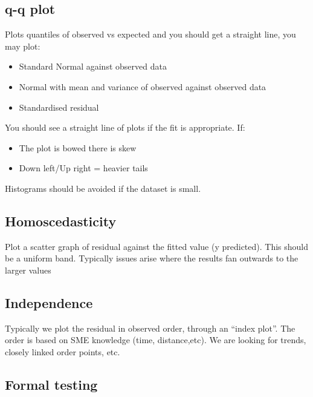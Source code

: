 \documentclass[
  letterpaper,
  DIV=11,
  numbers=noendperiod]{scrreprt}
\providecommand{\tightlist}{%
  \setlength{\itemsep}{0pt}\setlength{\parskip}{0pt}}\usepackage{longtable,booktabs,array}
\begin{document}
\hypertarget{q-q-plot}{%
\subsection{q-q plot}\label{q-q-plot}}

Plots quantiles of observed vs expected and you should get a straight
line, you may plot:

\begin{itemize}
\tightlist
\item
  Standard Normal against observed data
\item
  Normal with mean and variance of observed against observed data
\item
  Standardised residual
\end{itemize}

You should see a straight line of plots if the fit is appropriate. If:

\begin{itemize}
\tightlist
\item
  The plot is bowed there is skew
\item
  Down left/Up right = heavier tails
\end{itemize}

Histograms should be avoided if the dataset is small.

\hypertarget{homoscedasticity}{%
\subsection{Homoscedasticity}\label{homoscedasticity}}

Plot a scatter graph of residual against the fitted value (y predicted).
This should be a uniform band. Typically issues arise where the results
fan outwards to the larger values

\hypertarget{independence}{%
\subsection{Independence}\label{independence}}

Typically we plot the residual in observed order, through an ``index
plot''. The order is based on SME knowledge (time, distance,etc). We are
looking for trends, closely linked order points, etc.

\hypertarget{formal-testing}{%
\subsection{Formal testing}\label{formal-testing}}
\end{document}
